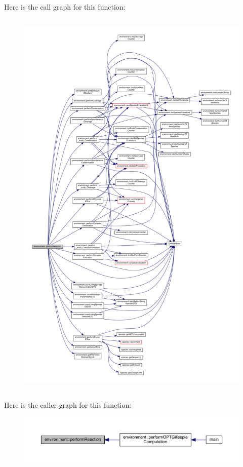 Here is the call graph for this function\-:\nopagebreak
\begin{figure}[H]
\begin{center}
\leavevmode
\includegraphics[height=550pt]{a00014_a1db4e67ba458a54f4fab3e10a203765c_cgraph}
\end{center}
\end{figure}




Here is the caller graph for this function\-:\nopagebreak
\begin{figure}[H]
\begin{center}
\leavevmode
\includegraphics[width=350pt]{a00014_a1db4e67ba458a54f4fab3e10a203765c_icgraph}
\end{center}
\end{figure}


